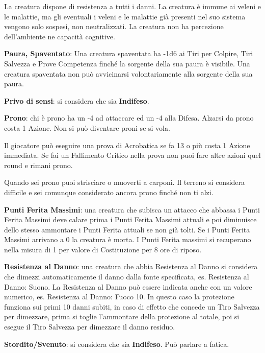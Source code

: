 \begin{multicols}{2}
La creatura dispone di resistenza a tutti i danni. La creatura è immune ai veleni e le malattie, ma gli eventuali i veleni e le malattie già presenti nel suo sistema vengono solo sospesi, non neutralizzati. La creatura non ha percezione dell'ambiente ne capacità cognitive.

\textbf{Paura, Spaventato}:\hypertarget{condizionepaura}{}
Una creatura spaventata ha -1d6 ai Tiri per Colpire, Tiri Salvezza e Prove Competenza finché la sorgente della sua paura è visibile. Una creatura spaventata non può avvicinarsi volontariamente alla sorgente della sua paura.

\textbf{Privo di sensi}: si considera che sia \textbf{Indifeso}.

\textbf{Prono}: chi è prono ha un -4 ad attaccare ed un -4 alla Difesa. Alzarsi da prono costa 1 Azione. Non si può diventare proni se si vola.

Il giocatore può eseguire una prova di Acrobatica se fa 13 o più costa 1 Azione immediata. Se fai un Fallimento Critico nella prova non puoi fare altre azioni quel round e rimani prono.

Quando sei prono puoi strisciare o muoverti a carponi. Il terreno si considera difficile e sei comunque considerato ancora prono finché non ti alzi.

\textbf{Punti Ferita Massimi}: una creatura che subisca un attacco che abbassa i Punti Ferita Massimi deve calare prima i Punti Ferita Massimi attuali e poi diminuisce dello stesso ammontare i Punti Ferita attuali se non già tolti. Se i Punti Ferita Massimi arrivano a 0 la creatura è morta. I Punti Ferita massimi si recuperano nella misura di 1 per valore di Costituzione per 8 ore di riposo.

\textbf{Resistenza al Danno}: una creatura che abbia Resistenza al Danno si considera che dimezzi automaticamente il danno dalla fonte specificata, es. Resistenza al Danno: Suono. La Resistenza al Danno può essere indicata anche con un valore numerico, es. Resistenza al Danno: Fuoco 10. In questo caso la protezione funziona sui primi 10 danni subiti, in caso di effetto che concede un Tiro Salvezza per dimezzare, prima si toglie l'ammontare della protezione al totale, poi si esegue il Tiro Salvezza per dimezzare il danno residuo.

\textbf{Stordito/Svenuto}: si considera che sia \textbf{Indifeso}. Può parlare a fatica.


\end{multicols}

